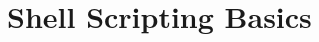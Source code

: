 \documentclass[slidestop,mathserif,compress,xcolor=svgnames]{beamer}
\newcommand*\enter{\tikz[baseline=-0.5ex] \draw[<-] (0,0) -| (0.5,0.1);}
\newenvironment{eblock}[0]
{
\begin{beamerboxesrounded}[upper=uppercol2,lower=lowercol2,shadow=true]}
{\end{beamerboxesrounded}}
\begin{document}

\section{Shell Scripting Basics}
\end{document}

